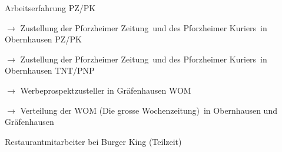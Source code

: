 \begin{rubric}{\textcolor{black!20!blue!100}{Arbeitserfahrung}}
		\entry*[08/2015 --- 09/2015]
			PZ/PK
			
			\setlength{\hangindent}{\widthof{$\rightarrow$ }}
			$\rightarrow$ Zustellung der \glqq Pforzheimer Zeitung\grqq\ und des \glqq Pforzheimer Kuriers\grqq\ in Obernhausen
		\entry*[08/2012 --- 09/2012]
			PZ/PK
			
			\setlength{\hangindent}{\widthof{$\rightarrow$ }}
			$\rightarrow$ Zustellung der \glqq Pforzheimer Zeitung\grqq\ und des \glqq Pforzheimer Kuriers\grqq\ in Obernhausen
		\entry*[06/2009 --- 10/2010]
			TNT/PNP
			
			\setlength{\hangindent}{\widthof{$\rightarrow$ }}
			$\rightarrow$ Werbeprospektzusteller in Gräfenhausen
		\entry*[06/2007 --- 12/2008]
			WOM
			
			\setlength{\hangindent}{\widthof{$\rightarrow$ }}
			$\rightarrow$ Verteilung der \glqq WOM (Die grosse Wochenzeitung)\grqq\ in Obernhausen und Gräfenhausen
			
		\entry*[04/2012 --- 10/2012]
			Restaurantmitarbeiter bei Burger King (Teilzeit)
\end{rubric}